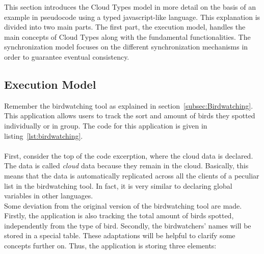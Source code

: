 \documentclass[a4paper,12pt]{report}
\begin{document}
This section introduces the Cloud Types model in more detail on the basis of an example in pseudocode using a typed javascript-like language. This explanation is divided into two main parts. The first part, the execution model, handles the main concepts of Cloud Types along with the fundamental functionalities. The synchronization model focuses on the different synchronization mechanisms in order to guarantee eventual consistency.

\begin{figure}
\begin{minipage}[t]{\textwidth}
\vspace{-3cm}

\end{minipage}
\end{figure}

\subsection{Execution Model}\label{subsec:ExecutionModel}

Remember the birdwatching tool as explained in section~\ref{subsec:Birdwatching}. This application allows users to track the sort and amount of birds they spotted individually or in group. The code for this application is given in listing~\ref{lst:birdwatching}. \\
\\
First, consider the top of the code excerption, where the cloud data is declared. The data is called \textit{cloud} data because they remain in the cloud. Basically, this means that the data is automatically replicated across all the clients of a peculiar list in the birdwatching tool. In fact, it is very similar to declaring global variables in other languages.\\ 
Some deviation from the original version of the birdwatching tool are made. Firstly, the application is also tracking the total amount of birds spotted, independently from the type of bird. Secondly, the birdwatchers' names will be stored in a special table. These adaptations will be helpful to clarify some concepts further on. Thus, the application is storing three elements:
\end{document}
